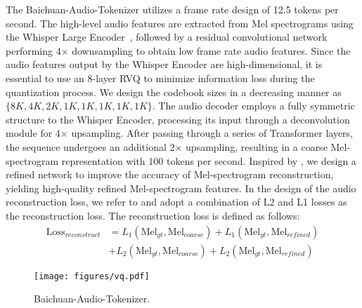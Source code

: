 The Baichuan-Audio-Tokenizer utilizes a frame rate design of 12.5 tokens per second. The high-level audio features are extracted from Mel spectrograms using the Whisper Large Encoder~\cite{radford2022robustspeechrecognitionlargescale}, followed by a residual convolutional network performing 4$\times$ downsampling to obtain low frame rate audio features. Since the audio features output by the Whisper Encoder are high-dimensional, it is essential to use an 8-layer RVQ to minimize information loss during the quantization process. We design the codebook sizes in a decreasing manner as $\{8K, 4K, 2K, 1K, 1K, 1K, 1K, 1K\}$. The audio decoder employs a fully symmetric structure to the Whisper Encoder, processing its input through a deconvolution module for 4× upsampling. After passing through a series of Transformer layers, the sequence undergoes an additional 2× upsampling, resulting in a coarse Mel-spectrogram representation with 100 tokens per second. Inspired by \cite{li2019neural,meng2024autoregressive}, we design a refined network to improve the accuracy of Mel-spectrogram reconstruction, yielding high-quality refined Mel-spectrogram features. In the design of the audio reconstruction loss, we refer to \cite{meng2024autoregressive} and adopt a combination of L2 and L1 losses as the reconstruction loss. The reconstruction loss is defined as follows:
\begin{equation}
\begin{aligned}
  \text{Loss}_{reconstruct} &= L_1(\text{Mel}_{gt}, \text{Mel}_{coarse}) + L_1(\text{Mel}_{gt}, \text{Mel}_{refined}) \\
  &+ L_2(\text{Mel}_{gt}, \text{Mel}_{coarse}) + L_2(\text{Mel}_{gt}, \text{Mel}_{refined})
\end{aligned}
\end{equation}
\begin{wrapfigure}{r}{0.45\textwidth}
  \centering
  \texttt{[image: figures/vq.pdf]}
  \caption{Baichuan-Audio-Tokenizer.}
  \label{fig:tokenizer}
\end{wrapfigure}
